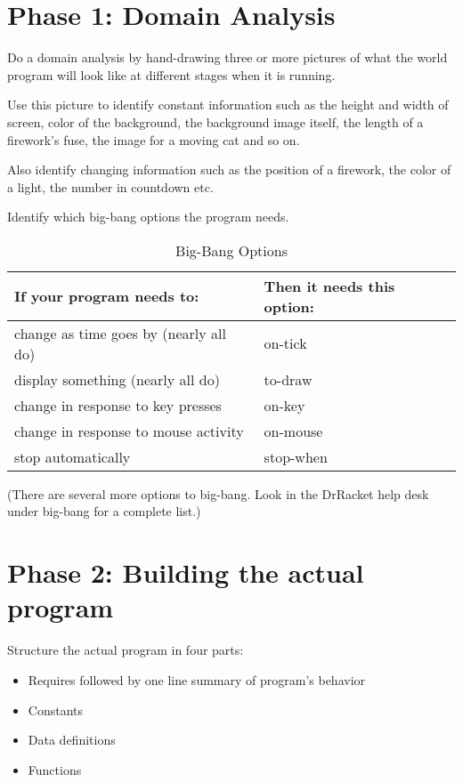 \documentclass[11pt,a4paper]{report}
\begin{document}
	\section{Phase 1: Domain Analysis}
	Do a domain analysis by hand-drawing three or more pictures of what the world program will look
	like at different stages when it is running.
	
	Use this picture to identify constant information such as the height and width of screen, color of 
	the background, the background image itself, the length of a firework's fuse, the image for a
	moving cat and so on.
	
	Also identify changing information such as the position of a firework, the color of a light, the
	number in countdown etc.
	
	Identify which big-bang options the program needs.
	
	\begin{table}[h]
		\renewcommand{\arraystretch}{2.5}
		\renewcommand{\tabcolsep}{0.2cm}
		\begin{tabularx}{\textwidth}{|X|X|}
			\hline
			\textbf{If your program needs to:}     & \textbf{Then it needs this option:} \\
			\hline
			change as time goes by (nearly all do) & on-tick                             \\
			\hline
			display something (nearly all do)      & to-draw                             \\
			\hline
			change in response to key presses      & on-key                              \\
			\hline
			change in response to mouse activity   & on-mouse                            \\
			\hline
			stop automatically                     & stop-when                           \\
			\hline
		\end{tabularx}
		\caption{Big-Bang Options}
	\end{table}

	(There are several more options to big-bang. Look in the DrRacket help desk under big-bang for
	a complete list.)
	\pagebreak
	\section{Phase 2: Building the actual program}
	Structure the actual program in four parts:
	\begin{itemize}
		\item Requires followed by one line summary of program's behavior
		\item Constants
		\item Data definitions
		\item Functions
	\end{itemize}
\end{document}
